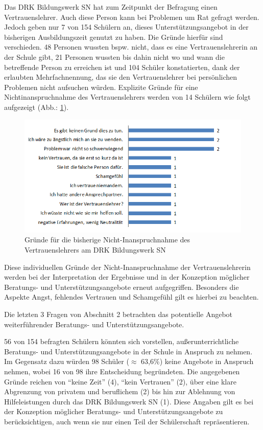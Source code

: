 Das DRK Bildungswerk SN hat zum Zeitpunkt der Befragung einen Vertrauenslehrer. Auch diese Person kann bei Problemen um Rat gefragt werden. Jedoch geben nur 7 von 154 Schülern an, dieses Unterstützungsangebot in der bisherigen Ausbildungszeit genutzt zu haben. Die Gründe hierfür sind verschieden. 48 Personen wussten bspw. nicht, dass es eine Vertrauenslehrerin an der Schule gibt, 21 Personen wussten bis dahin nicht wo und wann die betreffende Person zu erreichen ist und 104 Schüler konstatierten, dank der erlaubten Mehrfachnennung, das sie den Vertrauenslehrer bei persönlichen Problemen nicht aufsuchen würden. Explizite Gründe für eine Nichtinanspruchnahme des Vertrauenslehrers werden von 14 Schülern wie folgt aufgezeigt (Abb.: \ref{fig:Gruende-fuer-die-Nichtinaspruchnahme-des-Vertrauenslehrers}).

\begin{figure}[ht]
	\centering
		\includegraphics[width=1.0\textwidth]{images/Gruende-fuer-die-Nichtinaspruchnahme-des-Vertrauenslehrers.png}
	\caption{Gründe für die bisherige Nicht-Inanspruchnahme des Vertrauenslehrers am DRK Bildungswerk SN}
	\label{fig:Gruende-fuer-die-Nichtinaspruchnahme-des-Vertrauenslehrers}
\end{figure}

\noindent
Diese individuellen Gründe der Nicht-Inanspruchnahme der Vertrauenslehrerin werden bei der Interpretation der Ergebnisse und in der Konzeption möglicher Beratungs- und Unterstützungsangebote erneut aufgegriffen. Besonders die Aspekte Angst, fehlendes Vertrauen und Schamgefühl gilt es hierbei zu beachten. 

Die letzten 3 Fragen von Abschnitt 2 betrachten das potentielle Angebot weiterführender Beratungs- und Unterstützungsangebote. 

56 von 154 befragten Schülern könnten sich vorstellen, außerunterrichtliche Beratungs- und Unterstützungsangebote in der Schule in Anspruch zu nehmen. Im Gegensatz dazu würden 98 Schüler ($\approx$ 63,6\%) keine Angebote in Anspruch nehmen, wobei 16 von 98 ihre Entscheidung begründeten. Die angegebenen Gründe reichen von "`keine  Zeit"' (4), "`kein Vertrauen"' (2), über eine klare Abgrenzung von privatem und beruflichem (2) bis hin zur Ablehnung von Hilfeleistungen durch das DRK Bildungswerk SN (1). Diese Angaben gilt es bei der Konzeption möglicher Beratungs- und Unterstützungsangebote zu berücksichtigen, auch wenn sie nur einen Teil der Schülerschaft repräsentieren.

